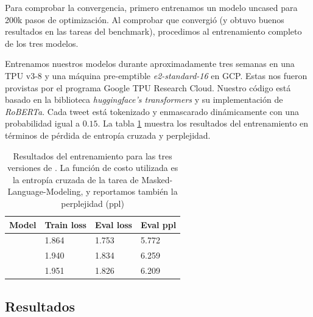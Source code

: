 Para comprobar la convergencia, primero entrenamos un modelo uncased para 200k pasos de optimización. Al comprobar que convergió (y obtuvo buenos resultados en las tareas del benchmark), procedimos al entrenamiento completo de los tres modelos.

Entrenamos nuestros modelos durante aproximadamente tres semanas en una TPU v3-8 y una máquina pre-emptible \emph{e2-standard-16} en GCP. Estas nos fueron provistas por el programa Google TPU Research Cloud. Nuestro código está basado en la biblioteca \emph{huggingface's transformers}\cite{wolf-etal-2020-transformers} y su implementación de \emph{RoBERTa}. Cada tweet está tokenizado y enmascarado dinámicamente con una probabilidad igual a $ 0.15 $. La tabla \ref{tab:training_results} muestra los resultados del entrenamiento en términos de pérdida de entropía cruzada y perplejidad.

\begin{table}[h]
    \centering
    \begin{tabular}{l|l l l|}
        Model   & Train loss & Eval loss   & Eval ppl \\
        \hline
        \cased{}   & 1.864      & 1.753       & 5.772    \\
        \uncased{} & 1.940      & 1.834       & 6.259    \\
        \deacc{}   & 1.951      & 1.826       & 6.209
    \end{tabular}
    \caption{Resultados del entrenamiento para las tres versiones de \robertuito{}. La función de costo utilizada es la entropía cruzada de la tarea de Masked-Language-Modeling, y reportamos también la perplejidad (ppl)}
    \label{tab:training_results}
\end{table}


\subsection{Resultados}


